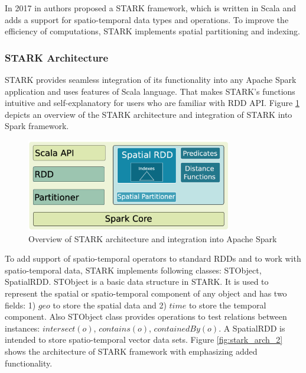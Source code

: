 In 2017 in \cite{article:stark} authors proposed a STARK framework, which is written in Scala and adds a support for spatio-temporal data types and operations. To improve the efficiency of computations, STARK implements spatial partitioning and indexing.

\subsubsection{STARK Architecture}
STARK provides seamless integration of its functionality into any Apache Spark application and uses features of Scala language. That makes STARK’s functions intuitive and self-explanatory for users who are familiar with RDD API. Figure \ref{fig:stark_arch} depicts an overview of the STARK architecture and integration of STARK into Spark framework.

\begin{figure}[!htb]
	\centering{}
	\includegraphics[width=0.8\textwidth]{images/stark_arch.png}
	\caption{Overview of STARK architecture and integration into Apache Spark \cite{article:stark}}
	\label{fig:stark_arch}
\end{figure}

To add support of spatio-temporal operators to standard RDDs and to work with spatio-temporal data, STARK implements following classes: STObject, SpatialRDD. STObject is a basic data structure in STARK. It is used to represent the spatial or spatio-temporal component of any object and has two fields: 1) $geo$ to store the spatial data and 2) $time$ to store the temporal component. Also STObject class provides operations to test relations between instances: $intersect(o)$, $contains(o)$, $containedBy(o)$. A SpatialRDD is intended to store spatio-temporal vector data sets. Figure \ref{fig:stark_arch_2} shows the architecture of STARK framework with emphasizing added functionality.

